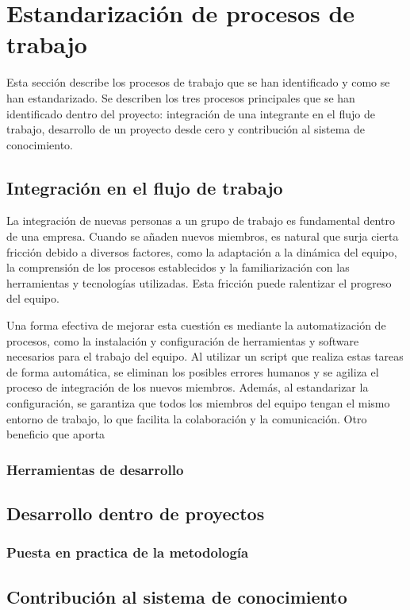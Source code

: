 \section{Estandarización de procesos de trabajo}
Esta sección describe los procesos de trabajo que se
han identificado y como se han estandarizado. Se describen
los tres procesos principales que se han identificado dentro
del proyecto: integración de una integrante en el flujo de trabajo,
desarrollo de un proyecto desde cero y contribución al sistema
de conocimiento.

\subsection{Integración en el flujo de trabajo}
La integración de nuevas personas a un grupo de trabajo es fundamental
dentro de una empresa. Cuando se añaden nuevos miembros, es natural que 
surja cierta fricción debido a diversos factores, como la adaptación a 
la dinámica del equipo, la comprensión de los procesos establecidos y la 
familiarización con las herramientas y tecnologías utilizadas. Esta fricción 
puede ralentizar el progreso del equipo.\medskip

Una forma efectiva de mejorar esta cuestión es mediante la automatización de 
procesos, como la instalación y configuración de herramientas y software necesarios 
para el trabajo del equipo. Al utilizar un script que realiza estas tareas de 
forma automática, se eliminan los posibles errores humanos y se agiliza el proceso 
de integración de los nuevos miembros. Además, al estandarizar la configuración, 
se garantiza que todos los miembros del equipo tengan el mismo entorno de trabajo, 
lo que facilita la colaboración y la comunicación. Otro beneficio que aporta 

\subsubsection{Herramientas de desarrollo}
\subsection{Desarrollo dentro de proyectos}
\subsubsection{Puesta en practica de la metodología}
\subsection{Contribución al sistema de conocimiento}

\pagebreak
